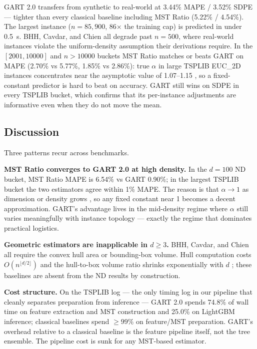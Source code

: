 GART 2.0 transfers from synthetic to real-world at 3.44\% MAPE / 3.52\% SDPE --- tighter than every classical baseline including MST Ratio (5.22\% / 4.54\%). The largest instance ($n = 85{,}900$, 86$\times$ the training cap) is predicted in under 0.5~s. BHH, Cavdar, and Chien all degrade past $n = 500$, where real-world instances violate the uniform-density assumption their derivations require. In the $[2001, 10000]$ and $n > 10000$ buckets MST Ratio matches or beats GART on MAPE (2.70\% vs 5.77\%, 1.85\% vs 2.86\%): true $\alpha$ in large TSPLIB EUC\_2D instances concentrates near the asymptotic value of 1.07--1.15 \citep{percus1996}, so a fixed-constant predictor is hard to beat on accuracy. GART still wins on SDPE in every TSPLIB bucket, which confirms that its per-instance adjustments are informative even when they do not move the mean.

\subsection{Discussion}

Three patterns recur across benchmarks.

\textbf{MST Ratio converges to GART 2.0 at high density.} In the $d = 100$ ND bucket, MST Ratio MAPE is 6.54\% vs GART 0.90\%; in the largest TSPLIB bucket the two estimators agree within 1\% MAPE. The reason is that $\alpha \to 1$ as dimension or density grows \citep{percus1996}, so any fixed constant near 1 becomes a decent approximation. GART's advantage lives in the mid-density regime where $\alpha$ still varies meaningfully with instance topology --- exactly the regime that dominates practical logistics.

\textbf{Geometric estimators are inapplicable in $d \ge 3$.} BHH, Cavdar, and Chien all require the convex hull area or bounding-box volume. Hull computation costs $O(n^{\lfloor d/2 \rfloor})$ \citep{orourke1998} and the hull-to-box volume ratio shrinks exponentially with $d$ \citep{carlsson2024upper}; these baselines are absent from the ND results by construction.

\textbf{Cost structure.} On the TSPLIB log --- the only timing log in our pipeline that cleanly separates preparation from inference --- GART 2.0 spends 74.8\% of wall time on feature extraction and MST construction and 25.0\% on LightGBM inference; classical baselines spend $\ge 99\%$ on feature/MST preparation. GART's overhead relative to a classical baseline is the feature pipeline itself, not the tree ensemble. The pipeline cost is sunk for any MST-based estimator.

